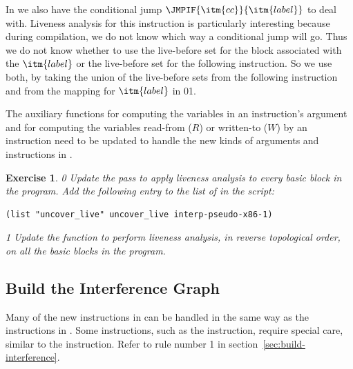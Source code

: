 \documentclass[7x10]{TimesAPriori_MIT}%
\def\racketEd{0}
\def\pythonEd{1}
\def\edition{1}
\newcommand{\racket}[1]{{\if\edition\racketEd{#1}\fi}}
\newcommand{\pythonColor}[0]{}
\newcommand{\python}[1]{{\if\edition\pythonEd\pythonColor #1\fi}}
\newtheorem{exercise}[theorem]{Exercise}
\numberwithin{theorem}{chapter}
\numberwithin{definition}{chapter}
\numberwithin{equation}{chapter}
\begin{document}
In \LangXIfVar{} we also have the conditional jump
$\JMPIF{\itm{cc}}{\itm{label}}$ to deal with.  Liveness analysis for
this instruction is particularly interesting because during
compilation, we do not know which way a conditional jump will go. Thus
we do not know whether to use the live-before set for the block
associated with the $\itm{label}$ or the live-before set for the
following instruction. So we use both, by taking the union of the
live-before sets from the following instruction and from the mapping
for $\itm{label}$ in
\racket{}\python{}.

The auxiliary functions for computing the variables in an
instruction's argument and for computing the variables read-from ($R$)
or written-to ($W$) by an instruction need to be updated to handle the
new kinds of arguments and instructions in \LangXIfVar{}.

\begin{exercise}\normalfont\normalsize
{\if\edition\racketEd
%
Update the  pass to apply liveness analysis to
every basic block in the program.
%
Add the following entry to the list of  in the
 script:
\begin{lstlisting}
(list "uncover_live" uncover_live interp-pseudo-x86-1)
\end{lstlisting}
\fi}

{\if\edition\pythonEd\pythonColor
%
Update the  function to perform liveness analysis,
in reverse topological order, on all the basic blocks in the
program.
%  
\fi}
\end{exercise}

\subsection{Build the Interference Graph}
\label{sec:build-interference-Lif}

Many of the new instructions in \LangXIfVar{} can be handled in the
same way as the instructions in \LangXVar{}.
%
Some instructions, such as the  instruction, require special care,
similar to the  instruction. Refer to rule number 1 in
section~\ref{sec:build-interference}.
\end{document}
